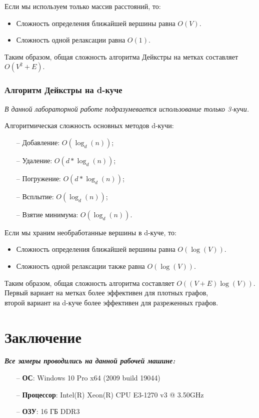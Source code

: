 \begin{text}
Если мы используем только массив расстояний, то:
\begin{itemize}
	\item Сложность определения ближайшей вершины равна $O(V)$.
	\item Сложность одной релаксации равна $O(1)$.
\end{itemize}

Таким образом, общая сложность алгоритма Дейкстры на метках составляет \textbf{$O(V^2 + E)$}.\\

\subsubsection{Алгоритм Дейкстры на d-куче}
\textit{В данной лабораторной работе подразумевается использование только 3-кучи.}

Алгоритмическая сложность основных методов d-кучи:
\begin{enumerate}
	\item[--] Добавление: $O(\log_d(n))$;
	\item[--] Удаление: $O(d * \log_d(n))$;
	\item[--] Погружение: $O(d * \log_d(n))$;
	\item[--] Всплытие: $O(\log_d(n))$;
	\item[--] Взятие минимума: $O(\log_d(n))$.
\end{enumerate}

Если мы храним необработанные вершины в d-куче, то:
\begin{itemize}
	\item Сложность определения ближайшей вершины равна $O(\log(V))$.
	\item Сложность одной релаксации также равна $O(\log(V))$.
\end{itemize}

Таким образом, общая сложность алгоритма составляет $O((V + E)\log(V))$.\\

Первый вариант на метках более эффективен для плотных графов,\\
второй вариант на d-куче более эффективен для разреженных графов.
\newpage

\section{Заключение}
\textbf{\textit{Все замеры проводились на данной рабочей машине:}}
\begin{enumerate}
	\item[--] \textbf{ОС}: Windows 10 Pro x64 (2009 build 19044)
	\item[--] \textbf{Процессор}: Intel(R) Xeon(R) CPU E3-1270 v3 @ 3.50GHz
	\item[--] \textbf{ОЗУ}: 16 ГБ DDR3
\end{enumerate}


\end{text}
